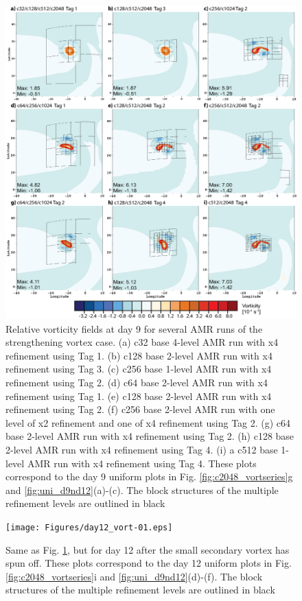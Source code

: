 \documentclass{ametsoc}
\begin{document}
\begin{figure}
   \centerline{%
   \noindent
   \includegraphics[width=\textwidth]{Figures/day9_vort-01.eps}}
   \caption{Relative vorticity fields at day 9 for several AMR runs of the 
   strengthening vortex case. (a) c32 base 4-level AMR run with x4 
   refinement using Tag 1. (b) c128 base 2-level AMR run with
   x4 refinement using Tag 3.
   (c) c256 base 1-level AMR run with x4 refinement using Tag 2.
   (d) c64 base 2-level AMR run with x4 refinement using Tag 1.
   (e) c128 base 2-level AMR run with x4 refinement using Tag 2.
   (f) c256 base 2-level AMR run with one level of x2 refinement 
   and one of x4 refinement using Tag 2.
   (g) c64 base 2-level AMR run with x4 refinement using Tag 2.
   (h) c128 base 2-level AMR run with x4 refinement using Tag 4.
   (i) a c512 base 1-level AMR run with x4 refinement using Tag 4. These plots
   correspond to the day 9 uniform plots in Fig. \ref{fig:c2048_vortseries}g and
   \ref{fig:uni_d9nd12}(a)-(c). The block structures of the multiple refinement
   levels are outlined in black
   }
   \label{fig:vort_amr_day9}
\end{figure}

\begin{figure}
   \centerline{%
   \noindent
   \texttt{[image: Figures/day12\_vort-01.eps]}}
   \caption{Same as Fig. \ref{fig:vort_amr_day9}, but for day 12 after the small
   secondary vortex has spun off. These plots correspond to the day 12 uniform
   plots in Fig. \ref{fig:c2048_vortseries}i and \ref{fig:uni_d9nd12}(d)-(f). 
   The block structures of the multiple refinement
   levels are outlined in black
   }
   \label{fig:vort_amr_day12}
\end{figure}
\end{document}
